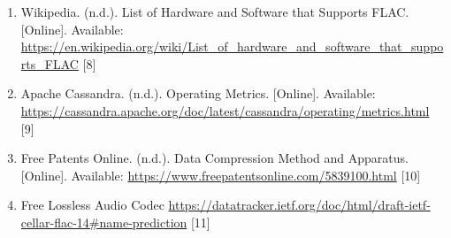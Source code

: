 \documentclass[conference]{IEEEtran}
\begin{document}
\begin{enumerate}
    \item Wikipedia. (n.d.). List of Hardware and Software that Supports FLAC. [Online]. Available: \url{https://en.wikipedia.org/wiki/List_of_hardware_and_software_that_supports_FLAC} [8]

    \item Apache Cassandra. (n.d.). Operating Metrics. [Online]. Available: \url{https://cassandra.apache.org/doc/latest/cassandra/operating/metrics.html} [9]

    \item Free Patents Online. (n.d.). Data Compression Method and Apparatus. [Online]. Available: \url{https://www.freepatentsonline.com/5839100.html} [10]

    \item Free Lossless Audio Codec \url{https://datatracker.ietf.org/doc/html/draft-ietf-cellar-flac-14#name-prediction} [11]
\end{enumerate}
\end{document}
